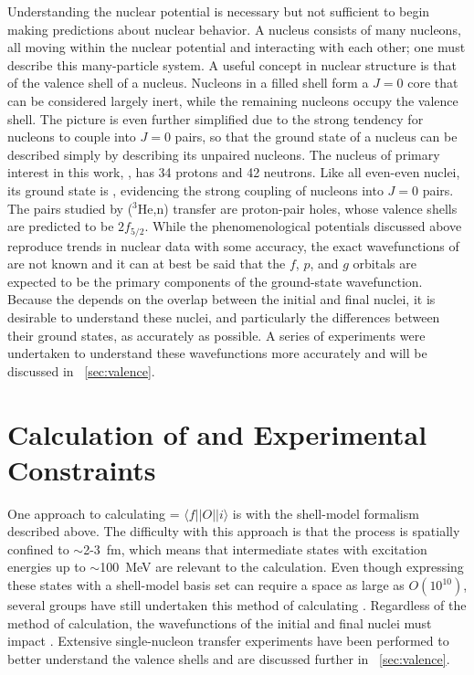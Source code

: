 Understanding the nuclear potential is necessary but not sufficient to begin making predictions about nuclear behavior.  A nucleus consists of many nucleons, all moving within the nuclear potential and interacting with each other; one must describe this many-particle system.  A useful concept in nuclear structure is that of the valence shell of a nucleus.  Nucleons in a filled shell form a $J=0$ core that can be considered largely inert, while the remaining nucleons occupy the valence shell.  The picture is even further simplified due to the strong tendency for nucleons to couple into $J=0$ pairs, so that the ground state of a nucleus can be described simply by describing its unpaired nucleons.  The nucleus of primary interest in this work, , has 34 protons and 42 neutrons.  Like all even-even nuclei, its ground state is \zp, evidencing the strong coupling of nucleons into $J=0$ pairs.  The pairs studied by ($^3$He,n) transfer are proton-pair holes, whose valence shells are predicted to be $2f_{5/2}$.  While the phenomenological potentials discussed above reproduce trends in nuclear data with some accuracy, the exact wavefunctions of \SeProducts are not known and it can at best be said that the $f$, $p$, and $g$ orbitals are expected to be the primary components of the ground-state wavefunction.  Because the \NME depends on the overlap between the initial and final nuclei, it is desirable to understand these nuclei, and particularly the differences between their ground states, as accurately as possible.  A series of experiments were undertaken to understand these wavefunctions more accurately and will be discussed in {\sect}~\ref{sec:valence}.

\section{Calculation of \NME and Experimental Constraints}

One approach to calculating \NME = $\langle f||O||i \rangle$ is with the shell-model formalism described above.  The difficulty with this approach is that the \zvbb process is spatially confined to $\sim$2-3~fm, which means that intermediate states with excitation energies up to $\sim$100~MeV \citep{anatomy} are relevant to the calculation.  Even though expressing these states with a shell-model basis set can require a space as large as $O(10^{10})$,  several groups have still undertaken this method of calculating \NME \citep{CaurierShellModel}.  Regardless of the method of calculation, the wavefunctions of the initial and final nuclei must impact \NME.  Extensive single-nucleon transfer experiments have been performed to better understand the valence shells and are discussed further in {\sect}~\ref{sec:valence}.

